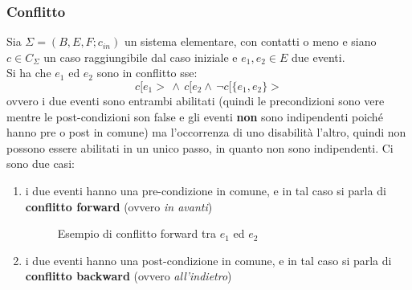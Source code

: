 \subsubsection{Conflitto}
\begin{definizione}
  Sia $\Sigma = (B, E, F;c_{in})$ un sistema elementare, con contatti o meno
  e siano $c\in C_\Sigma$ un caso raggiungibile dal caso iniziale e $e_1, e_2\in
  E$ due eventi.\\
  Si ha che $e_1$ ed $e_2$ sono in conflitto sse:
  \[c[e_1>\,\wedge\, c[e_2 \wedge\,\neg c[\{e_1, e_2\}>\]
  ovvero i due eventi sono entrambi abilitati (quindi le precondizioni sono vere
  mentre le post-condizioni son false e gli eventi \textbf{non} sono indipendenti poiché hanno pre o post in comune) ma l'occorrenza di uno disabilità
  l'altro, quindi non possono essere abilitati in un unico passo, in quanto non
  sono indipendenti. Ci sono due casi:
  \begin{enumerate}
    \item i due eventi hanno una pre-condizione in comune, e in tal caso si parla
    di \textbf{conflitto forward} (ovvero \textit{in avanti})
    \begin{figure}[H]
      \centering
      \caption{Esempio di conflitto forward tra $e_1$ ed $e_2$}
    \end{figure}
    \item i due eventi hanno una post-condizione in comune, e in tal caso si parla
    di \textbf{conflitto backward} (ovvero \textit{all'indietro})
    \begin{figure}[H]
      \centering
\end{figure}
\end{enumerate}
\end{definizione}
